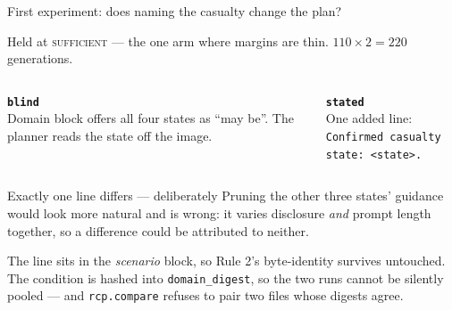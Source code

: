 \documentclass[aspectratio=169,11pt]{beamer}
\newcommand{\cs}[1]{\textsc{\small #1}}
\begin{document}
\begin{frame}{First experiment: does naming the casualty change the plan?}

Held at \cs{sufficient} --- the one arm where margins are thin.
$110 \times 2 = 220$ generations.

\medskip
\begin{columns}[t]
\textbf{\texttt{blind}}\\
\small Domain block offers all four states as ``may be''. The planner reads the state off
the image.

\textbf{\texttt{stated}}\\
\small One added line:\\[2pt]
\texttt{\footnotesize Confirmed casualty state: <state>.}
\end{columns}

\medskip
\begin{block}{Exactly one line differs --- deliberately}
Pruning the other three states' guidance would look more natural and is wrong: it varies
disclosure \emph{and} prompt length together, so a difference could be attributed to
neither.
\end{block}

{\small The line sits in the \emph{scenario} block, so Rule 2's byte-identity survives
untouched. The condition is hashed into \texttt{domain\_digest}, so the two runs cannot be
silently pooled --- and \texttt{rcp.compare} refuses to pair two files whose digests
agree.}

\end{frame}

\end{document}
